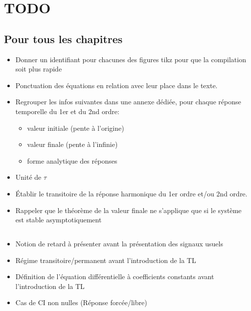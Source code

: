 \chapter{TODO}

\section*{Pour tous les chapitres}
\begin{itemize}
\item Donner un identifiant pour chacunes des figures tikz pour que la compilation soit plus rapide
\item Ponctuation des équations en relation avec leur place dans le texte.
\item Regrouper les infos suivantes dans une annexe dédiée, pour chaque réponse temporelle du 1er et du 2nd ordre:
    \begin{itemize}
        \item valeur initiale (pente à l'origine)
        \item valeur finale (pente à l'infinie)
        \item forme analytique des réponses
    \end{itemize}
\item Unité de $\tau$
\item \'Etablir le transitoire de la réponse harmonique du 1er ordre et/ou 2nd ordre.
\item Rappeler que le théorème de la valeur finale ne s'applique que si le système est stable asymptotiquement
\end{itemize}

\section*{}     
\begin{itemize}
\item Notion de retard à présenter avant la présentation des signaux usuels
\item Régime transitoire/permanent avant l'introduction de la TL
\item Définition de l'équation différentielle à coefficients constants avant l'introduction de la TL
    \item Cas de CI non nulles (Réponse forcée/libre)
\end{itemize}
\section*{}

